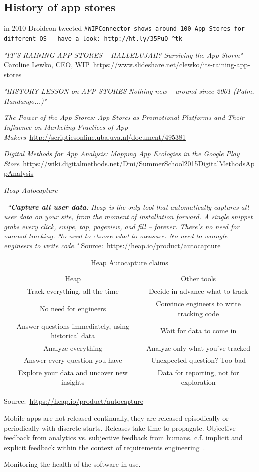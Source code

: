 \subsection{History of app stores}
in 2010 Droidcon tweeted \texttt{#WIPConnector shows around 100 App Stores for different OS - have a look: http://ht.ly/35PuQ ^tk}

\emph{"IT’S RAINING APP STORES – HALLELUJAH? Surviving the App Storm"} Caroline Lewko, CEO, WIP~\url{https://www.slideshare.net/clewko/its-raining-app-stores}

\emph{"HISTORY LESSON on APP STORES Nothing new – around since 2001 (Palm, Handango...)"}

\emph{The Power of the App Stores: App Stores as Promotional Platforms 
and Their Influence on Marketing Practices of App Makers}~\url{http://scriptiesonline.uba.uva.nl/document/495381}

\emph{Digital Methods for App Analysis: Mapping App Ecologies in the Google Play Store}~\url{https://wiki.digitalmethods.net/Dmi/SummerSchool2015DigitalMethodsAppAnalysis}


\textit{Heap Autocapture}
 
~\emph{``\textbf{Capture all user data}: Heap is the only tool that automatically captures all user data on your site, from the moment of installation forward. A single snippet grabs every click, swipe, tap, pageview, and fill – forever. There’s no need for manual tracking. No need to choose what to measure. No need to wrangle engineers to write code."} Source:~\url{https://heap.io/product/autocapture}
 
\begin{table}[]
    \centering
    \begin{tabular}{c|c}
        Heap &Other tools \\
        Track everything, all the time &Decide in advance what to track \\
        No need for engineers &Convince engineers to write tracking code \\
        Answer questions immediately, using historical data &Wait for data to come in \\
        Analyze everything &Analyze only what you’ve tracked \\
        Answer every question you have &Unexpected question? Too bad \\
        Explore your data and uncover new insights &Data for reporting, not for exploration \\
    \end{tabular}
    \caption{Heap Autocapture claims}
    \label{tab:heap_autocapture}
\end{table}
Source:~\url{https://heap.io/product/autocapture}


Mobile apps are not released continually, they are released episodically or periodically with discrete starts. Releases take time to propagate. 
Objective feedback from analytics vs. subjective feedback from humans. c.f. implicit and explicit feedback within the context of requirements engineering~\citep{maalej2016_towards_data_driven_requirements_engineering}.

Monitoring the health of the software in use.
